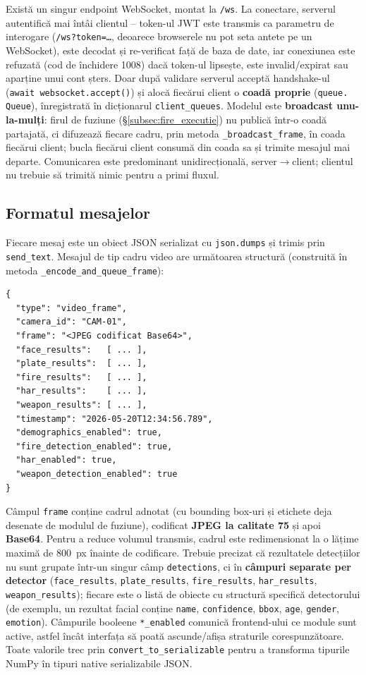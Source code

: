 \documentclass[../../main.tex]{subfiles}
\begin{document}
Există un singur endpoint WebSocket, montat la \texttt{/ws}. La conectare, serverul autentifică mai întâi clientul -- token-ul JWT este transmis ca parametru de interogare (\texttt{/ws?token=\dots}, deoarece browserele nu pot seta antete pe un WebSocket), este decodat și re-verificat față de baza de date, iar conexiunea este refuzată (cod de închidere 1008) dacă token-ul lipsește, este invalid/expirat sau aparține unui cont șters. Doar după validare serverul acceptă handshake-ul (\texttt{await websocket.accept()}) și alocă fiecărui client o \textbf{coadă proprie} (\texttt{queue.} \texttt{Queue}), înregistrată în dicționarul \texttt{client\_queues}. Modelul este \textbf{broadcast unu-la-mulți}: firul de fuziune (\S\ref{subsec:fire_executie}) nu publică într-o coadă partajată, ci difuzează fiecare cadru, prin metoda \texttt{\_broadcast\_frame}, în coada fiecărui client; bucla fiecărui client consumă din coada sa și trimite mesajul mai departe. Comunicarea este predominant unidirecțională, server$\to$client; clientul nu trebuie să trimită nimic pentru a primi fluxul.

\subsection{Formatul mesajelor}

Fiecare mesaj este un obiect JSON serializat cu \texttt{json.dumps} și trimis prin \texttt{send\_text}. Mesajul de tip cadru video are următoarea structură (construită în metoda \texttt{\_encode\_and\_queue\_frame}):


\begin{verbatim}
{
  "type": "video_frame",
  "camera_id": "CAM-01",
  "frame": "<JPEG codificat Base64>",
  "face_results":   [ ... ],
  "plate_results":  [ ... ],
  "fire_results":   [ ... ],
  "har_results":    [ ... ],
  "weapon_results": [ ... ],
  "timestamp": "2026-05-20T12:34:56.789",
  "demographics_enabled": true,
  "fire_detection_enabled": true,
  "har_enabled": true,
  "weapon_detection_enabled": true
}
\end{verbatim}

Câmpul \texttt{frame} conține cadrul adnotat (cu bounding box-uri și etichete deja desenate de modulul de fuziune), codificat \textbf{JPEG la calitate 75} și apoi \textbf{Base64}. Pentru a reduce volumul transmis, cadrul este redimensionat la o lățime maximă de 800~px înainte de codificare. Trebuie precizat că rezultatele detecțiilor nu sunt grupate într-un singur câmp \texttt{detections}, ci în \textbf{câmpuri separate per detector} (\texttt{face\_results}, \texttt{plate\_results}, \texttt{fire\_results}, \texttt{har\_results}, \linebreak \texttt{weapon\_results}); fiecare este o listă de obiecte cu structură specifică detectorului (de exemplu, un rezultat facial conține \texttt{name}, \texttt{confidence}, \texttt{bbox}, \texttt{age}, \texttt{gender}, \texttt{emotion}). Câmpurile booleene \texttt{*\_enabled} comunică frontend-ului ce module sunt active, astfel încât interfața să poată ascunde/afișa straturile corespunzătoare. Toate valorile trec prin \texttt{convert\_to\_serializable} pentru a transforma tipurile NumPy în tipuri native serializabile JSON.
\end{document}
